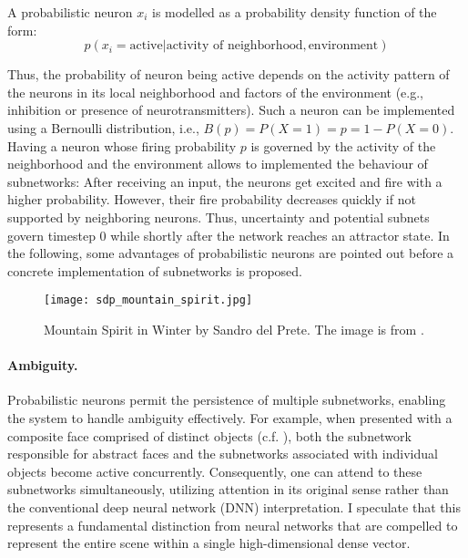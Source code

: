 A probabilistic neuron $x_i$ is modelled as a probability density function of the form:
\begin{equation}
    p(x_i = \text{active} | \text{activity of neighborhood}, \text{environment}) 
\end{equation}

Thus, the probability of neuron being active depends on the activity pattern of the neurons in its local neighborhood and factors of the environment (e.g., inhibition or presence of neurotransmitters).
Such a neuron can be implemented using a Bernoulli distribution, i.e., $B(p) = P(X = 1) = p = 1 - P(X=0)$. Having a neuron whose firing probability $p$ is governed by the activity of the neighborhood and the environment allows to implemented the behaviour of subnetworks: After receiving an input, the neurons get excited and fire with a higher probability. However, their fire probability decreases quickly if not supported by neighboring neurons. Thus, uncertainty and potential subnets govern timestep 0 while shortly after the network reaches an attractor state. In the following, some advantages of probabilistic neurons are pointed out before a concrete implementation of subnetworks is proposed.


\begin{figure}[h]
    \centering
    \texttt{[image: sdp\_mountain\_spirit.jpg]}
    \caption[Mountain Spirit in Winter by Sandro del Prete]{Mountain Spirit in Winter by Sandro del Prete. The image is from .}
\end{figure}


\paragraph{Ambiguity.} Probabilistic neurons permit the persistence of multiple subnetworks, enabling the system to handle ambiguity effectively. For example, when presented with a composite face comprised of distinct objects (c.f. ), both the subnetwork responsible for abstract faces and the subnetworks associated with individual objects become active concurrently. Consequently, one can attend to these subnetworks simultaneously, utilizing attention in its original sense rather than the conventional deep neural network (DNN) interpretation. I speculate that this represents a fundamental distinction from neural networks that are compelled to represent the entire scene within a single high-dimensional dense vector.

